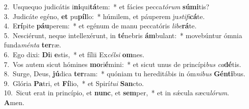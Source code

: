 {2.~}Usquequo judicátis i\textbf{ni}qui\textbf{tá}tem:~* et fácies pecca\textit{tó}\textit{rum} \textbf{sú}\textbf{mi}tis?\\
{3.~}Judicáte egéno, \textbf{et} pu\textbf{píl}lo:~* húmilem, et páuperem ju\textit{sti}\textit{fi}\textbf{cá}te.\\
{4.~}E\textbf{rí}pite \textbf{páu}perem:~* et egénum de manu peccatóris \textit{li}\textit{be}\textbf{rá}te.\\
{5.~}Nesciérunt, neque intellexérunt, in \textbf{té}nebris \textbf{ám}bulant:~* movebúntur ómnia funda\textit{mén}\textit{ta} \textbf{ter}ræ.\\
{6.~}Ego dixi: \textbf{Di}i \textbf{e}stis,~* et fílii Ex\textit{cél}\textit{si} \textbf{om}nes.\\
{7.~}Vos autem sicut hómines \textbf{mo}ri\textbf{é}mini:~* et sicut unus de princípi\textit{bus} \textit{ca}\textbf{dé}tis.\\
{8.~}Surge, Deus, \textbf{jú}dica \textbf{ter}ram:~* quóniam tu hereditábis in óm\textit{ni}\textit{bus} \textbf{Gén}\textbf{ti}bus.\\
{9.~}Glória \textbf{Pa}tri, et \textbf{Fí}lio,~* et Spirí\textit{tu}\textit{i} \textbf{San}cto.\\
{10.~}Sicut erat in princípio, et \textbf{nunc}, et \textbf{sem}per,~* et in sǽcula sæcu\textit{ló}\textit{rum}. \textbf{A}men.\\
